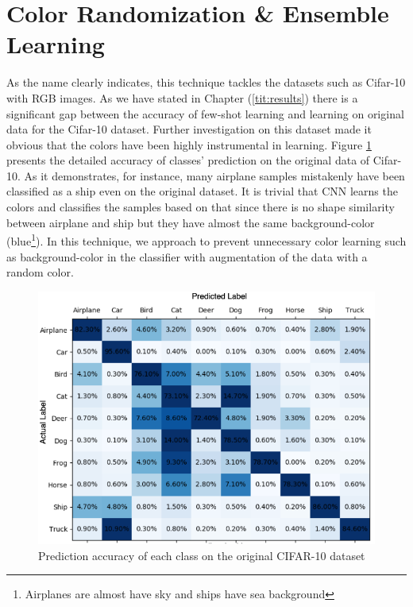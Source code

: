 \section{Color Randomization \& Ensemble Learning}
As the name clearly indicates, this technique tackles the datasets such as Cifar-10 with RGB images.
As we have stated in Chapter (\ref{tit:results}) there is a significant gap between the accuracy of few-shot
learning and learning on original data for the Cifar-10 dataset. Further investigation on this
dataset made it obvious that the colors have been highly instrumental in learning. Figure \ref{fig:original_cifar_10}
presents the detailed accuracy of classes' prediction on the original data of Cifar-10. As it
demonstrates, for instance, many airplane samples mistakenly have been classified as a ship even on
the original dataset. It is trivial that CNN learns the colors and classifies the samples based on
that since there is no shape similarity between airplane and ship but they have almost the same
background-color (blue\footnote{Airplanes are almost have sky and ships have sea background}). In this technique, we approach to prevent unnecessary color learning such as background-color in the classifier with augmentation of the data with a random color.

\begin{figure}
  \centering
  \label{fig:original_cifar_10}
  \includegraphics[width=1\textwidth]{fig/contribution/original_cifar_10}
  \caption{Prediction accuracy of each class on the original CIFAR-10 dataset}
\end{figure}

